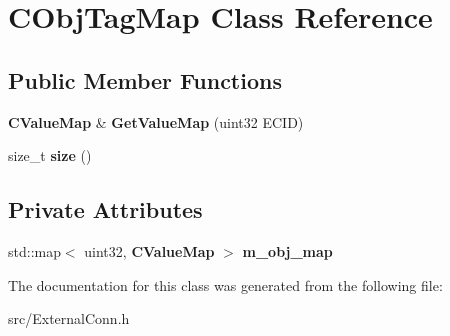 \section{CObjTagMap Class Reference}
\label{classCObjTagMap}
\subsection*{Public Member Functions}
\begin{DoxyCompactItemize}
\item 
{\bf CValueMap} \& {\bfseries GetValueMap} (uint32 ECID)\label{classCObjTagMap_af41bb802a0b9164ec5a1a18ccde1c387}

\item 
size\_\-t {\bfseries size} ()\label{classCObjTagMap_af0b1a862d54ebe0f2a9132cf4f999794}

\end{DoxyCompactItemize}
\subsection*{Private Attributes}
\begin{DoxyCompactItemize}
\item 
std::map$<$ uint32, {\bf CValueMap} $>$ {\bfseries m\_\-obj\_\-map}\label{classCObjTagMap_a00a427f2ea646698099f4a6f0bb4ba9d}

\end{DoxyCompactItemize}


The documentation for this class was generated from the following file:\begin{DoxyCompactItemize}
\item 
src/ExternalConn.h\end{DoxyCompactItemize}
